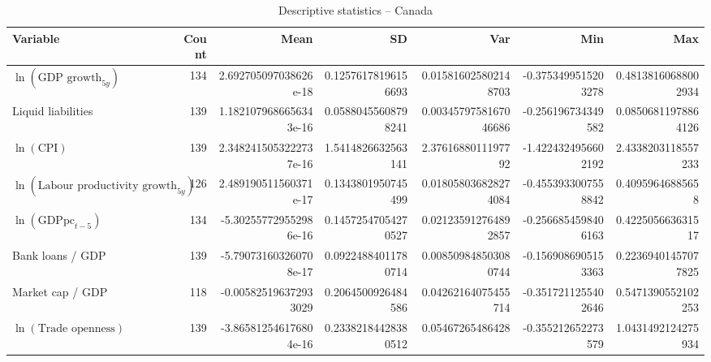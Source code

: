 \begin{table}[!htbp]
\centering
\caption{Descriptive statistics -- Canada}
\footnotesize
\begin{tabular}{lrrrrrr}
\toprule
Variable & Count & Mean & SD & Var & Min & Max \\
\midrule
$\ln(\text{GDP growth}_{5y})$ & 134 & 2.692705097038626e-18 & 0.12576178196156693 & 0.015816025802148703 & -0.3753499515203278 & 0.48138160688002934 \\
Liquid liabilities & 139 & 1.1821079686656343e-16 & 0.05880455608798241 & 0.0034579758167046686 & -0.256196734349582 & 0.08506811978864126 \\
$\ln(\text{CPI})$ & 139 & 2.3482415053222737e-16 & 1.5414826632563141 & 2.3761688011197792 & -1.4224324956602192 & 2.4338203118557233 \\
$\ln(\text{Labour productivity growth}_{5y})$ & 126 & 2.489190511560371e-17 & 0.1343801950745499 & 0.018058036828274084 & -0.4553933007558842 & 0.40959646885658 \\
$\ln(\text{GDPpc}_{t-5})$ & 134 & -5.302557729552986e-16 & 0.14572547054270527 & 0.021235912764892857 & -0.2566854598406163 & 0.422505663631517 \\
Bank loans / GDP & 139 & -5.790731603260708e-17 & 0.09224884011780714 & 0.008509848503080744 & -0.1569086905153363 & 0.22369401457077825 \\
Market cap / GDP & 118 & -0.005825196372933029 & 0.2064500926484586 & 0.04262164075455714 & -0.3517211255402646 & 0.5471390552102253 \\
$\ln(\text{Trade openness})$ & 139 & -3.865812546176804e-16 & 0.23382184428380512 & 0.05467265486428 & -0.355212652273579 & 1.0431492124275934 \\
\bottomrule
\end{tabular}
\end{table}


